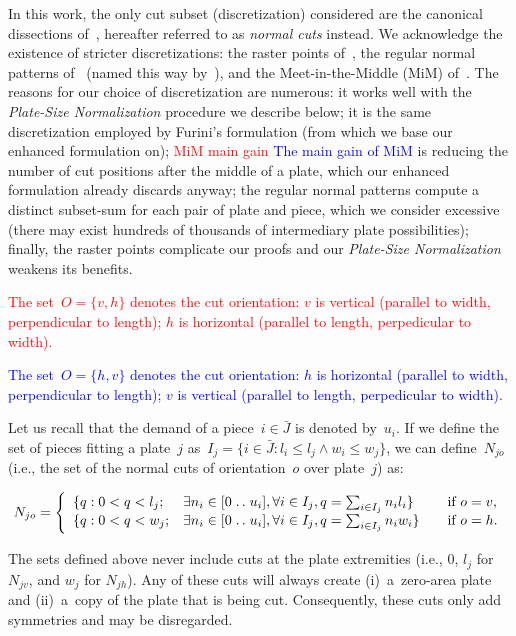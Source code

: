 \documentclass[ppgc,tese,english,formais,babel]{iiufrgs}
\newif\iffinalversion
\newcommand{\newtext}[1]{\iffinalversion%
#1%
\else%
\textcolor{blue}{#1}%
\fi%
}
\newcommand{\oldtext}[1]{\iffinalversion%
\else%
\textcolor{red}{#1}%
\fi%
}
\newcommand{\isep}{\mathrel{{.}\,{.}}\nobreak} %
\begin{document}
In this work, the only cut subset (discretization) considered are the canonical dissections of~\citet{herz:1972}, hereafter referred to as \emph{normal cuts} instead.
We acknowledge the existence of stricter discretizations: the raster points of~\citet{terno:1987,guntram:1966}, the regular normal patterns of~\citet{boschetti:2002} (named this way by~\citet{cote:2018}), and the Meet-in-the-Middle (MiM) of~\citet{cote:2018}.
The reasons for our choice of discretization are numerous:
it works well with the \emph{Plate-Size Normalization} procedure we describe below;
it is the same discretization employed by Furini's formulation (from which we base our enhanced formulation on);
\oldtext{MiM main gain}\newtext{The main gain of MiM} is reducing the number of cut positions after the middle of a plate, which our enhanced formulation already discards anyway;
the regular normal patterns compute a distinct subset-sum for each pair of plate and piece, which we consider excessive (there may exist hundreds of thousands of intermediary plate possibilities);
finally, the raster points complicate our proofs and our \emph{Plate-Size Normalization} weakens its benefits.

\oldtext{The set~\(O = \{v, h\}\) denotes the cut orientation: \(v\) is vertical (parallel to width, perpendicular to length); \(h\) is horizontal (parallel to length, perpedicular to width).}
\newtext{The set~\(O = \{h, v\}\) denotes the cut orientation: \(h\) is horizontal (parallel to width, perpendicular to length); \(v\) is vertical (parallel to length, perpedicular to width).}
Let us recall that the demand of a piece~\(i \in \bar{J}\) is denoted by~\(u_i\).
If we define the set of pieces fitting a plate~\(j\) as~\(I_j = \{i \in \bar{J} : l_i \leq l_j \land w_i \leq w_j \}\), we can define~\(N_{jo}\) (i.e., the set of the normal cuts of orientation~\(o\) over plate~\(j\)) as:

{\iffinalversion\else\color{blue}\fi
\begin{equation}
N_{jo}= \left\{
\begin{array}{lllr}
  \{q: 0 < q < l_j; & \exists n_i \in [0 \isep u_i], \forall i \in I_j, q = \sum_{i\in I_j} n_i l_i \} & \quad \text{if } o = v,\\
  \{q: 0 < q < w_j; & \exists n_i \in [0 \isep u_i], \forall i \in I_j, q = \sum_{i\in I_j} n_i w_i \} & \quad \text{if } o = h.
\end{array}\right.
\end{equation}
}

The sets defined above never include cuts at the plate extremities (i.e., \(0\), \(l_j\) for \(N_{jv}\), and \(w_j\) for \(N_{jh}\)).
Any of these cuts will always create (i)~a~zero-area plate and (ii)~a~copy of the plate that is being cut.
Consequently, these cuts only add symmetries and may be disregarded.
\end{document}

